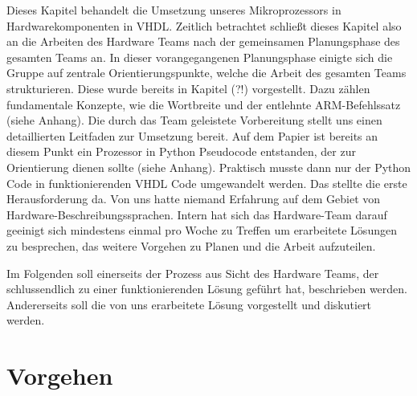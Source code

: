 \documentclass[paper=a4,fontsize=12pt,twocolumn]{scrreprt}
\begin{document}
Dieses Kapitel behandelt die Umsetzung unseres Mikroprozessors in Hardwarekomponenten in VHDL.
Zeitlich betrachtet schließt dieses Kapitel also an die Arbeiten des Hardware Teams nach der gemeinsamen Planungsphase des gesamten Teams an.
In dieser vorangegangenen Planungsphase einigte sich die Gruppe auf zentrale Orientierungspunkte, welche die Arbeit des gesamten Teams strukturieren.
Diese wurde bereits in Kapitel (?!) vorgestellt.
Dazu zählen fundamentale Konzepte, wie die Wortbreite und der entlehnte ARM-Befehlssatz (siehe Anhang).
Die durch das Team geleistete Vorbereitung stellt uns einen detaillierten Leitfaden zur Umsetzung bereit.
Auf dem Papier ist bereits an diesem Punkt ein Prozessor in Python Pseudocode entstanden, der zur Orientierung dienen sollte (siehe Anhang).
Praktisch musste dann nur der Python Code in funktionierenden VHDL Code umgewandelt werden.
Das stellte die erste Herausforderung da.
Von uns hatte niemand Erfahrung auf dem Gebiet von Hardware-Beschreibungssprachen.
Intern hat sich das Hardware-Team darauf geeinigt sich mindestens einmal pro Woche zu Treffen um erarbeitete Lösungen zu besprechen, das weitere Vorgehen zu Planen und die Arbeit aufzuteilen.

Im Folgenden soll einerseits der Prozess aus Sicht des Hardware Teams, der schlussendlich zu einer funktionierenden Lösung geführt hat, beschrieben werden.
Andererseits soll die von uns erarbeitete Lösung vorgestellt und diskutiert werden.


\section{Vorgehen}
\end{document}
